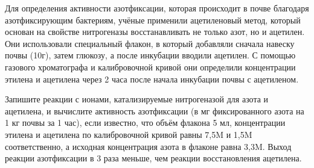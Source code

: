 
Для определения активности азотфиксации, которая происходит в почве благодаря азотфиксирующим бактериям, учёные применили ацетиленовый метод, который основан на свойстве нитрогеназы восстанавливать не только азот, но и ацетилен. Они использовали специальный флакон, в который добавляли сначала навеску почвы (10г), затем глюкозу, а после инкубации вводили ацетилен. С помощью газового хроматографа и калибровочной кривой они определили концентрации этилена и ацетилена через 2 часа после начала инкубации почвы с ацетиленом.

Запишите реакции с ионами, катализируемые нитрогеназой для азота и ацетилена, и вычислите активность азотфиксации (в мг фиксированного азота на 1 кг почвы за 1 час), если известно, что объём флакона 5 мл, концентрации этилена и ацетилена по калибровочной кривой равны 7,5M и 1,5M соответственно, а исходная концентрация азота в флаконе равна 3,3M. Выход реакции азотфиксации в 3 раза меньше, чем реакции восстановления ацетилена.
